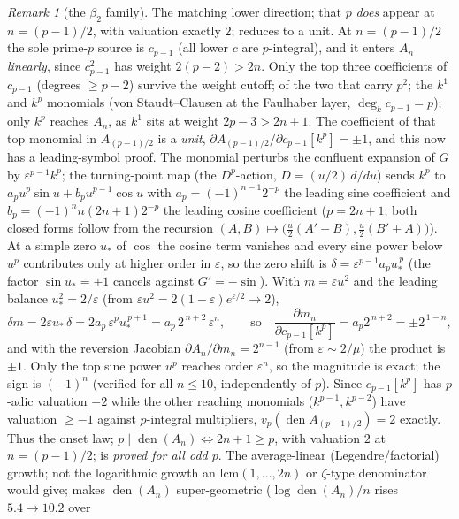 \documentclass[11pt]{article}
\theoremstyle{plain}
\theoremstyle{definition}
\theoremstyle{remark}
\newtheorem{remark}[theorem]{Remark}
\begin{document}
\begin{remark}[the $\beta_2$ family]
The matching lower direction; that $p$ \emph{does} appear at $n=(p-1)/2$, with valuation
exactly $2$; reduces to a unit. At $n=(p-1)/2$ the sole prime-$p$ source is $c_{p-1}$ (all lower
$c$ are $p$-integral), and it enters $A_n$ \emph{linearly}, since $c_{p-1}^2$ has weight
$2(p-2)>2n$. Only the top three coefficients of $c_{p-1}$ (degrees $\ge p-2$) survive the weight
cutoff; of the two that carry $p^2$; the $k^1$ and $k^p$ monomials (von Staudt--Clausen at the
Faulhaber layer, $\deg_kc_{p-1}=p$); only $k^p$ reaches $A_n$, as $k^1$ sits at weight
$2p-3>2n+1$. The coefficient of that top monomial in $A_{(p-1)/2}$ is a \emph{unit},
$\partial A_{(p-1)/2}/\partial c_{p-1}[k^p]=\pm1$, and this now has a leading-symbol proof. The
monomial perturbs the confluent expansion of $G$ by $\varepsilon^{p-1}k^p$; the turning-point map
(the $D^p$-action, $D=(u/2)\,d/du$) sends $k^p$ to $a_pu^p\sin u+b_pu^{p-1}\cos u$ with
$a_p=(-1)^{n-1}2^{-p}$ the leading sine coefficient and $b_p=(-1)^nn(2n+1)2^{-p}$ the leading cosine
coefficient ($p=2n+1$; both closed forms follow from the recursion
$(A,B)\mapsto\bigl(\tfrac u2(A'-B),\tfrac u2(B'+A)\bigr)$). At a simple zero $u_*$ of $\cos$ the
cosine term vanishes and every sine power below $u^p$ contributes only at higher order in
$\varepsilon$, so the zero shift is $\delta=\varepsilon^{p-1}a_pu_*^{\,p}$ (the factor
$\sin u_*=\pm1$ cancels against $G'=-\sin$). With $m=\varepsilon u^2$ and the leading balance
$u_*^2=2/\varepsilon$ (from $\varepsilon u^2=2(1-\varepsilon)e^{\varepsilon/2}\to2$),
\[
   \delta m=2\varepsilon u_*\,\delta=2a_p\,\varepsilon^{p}u_*^{\,p+1}
   =a_p\,2^{\,n+2}\,\varepsilon^{n},\qquad\text{so}\quad
   \frac{\partial m_n}{\partial c_{p-1}[k^p]}=a_p2^{\,n+2}=\pm2^{\,1-n},
\]
and with the reversion Jacobian $\partial A_n/\partial m_n=2^{n-1}$ (from $\varepsilon\sim2/\mu$)
the product is $\pm1$. Only the top sine power $u^p$ reaches order $\varepsilon^n$, so the magnitude
is exact; the sign is $(-1)^n$ (verified for all $n\le10$, independently of $p$). Since
$c_{p-1}[k^p]$ has $p$-adic valuation $-2$ while the other reaching monomials ($k^{p-1},k^{p-2}$)
have valuation $\ge-1$ against $p$-integral multipliers, $v_p(\operatorname{den}A_{(p-1)/2})=2$
exactly. Thus the onset law; $p\mid\operatorname{den}(A_n)\iff 2n+1\ge p$, with valuation $2$ at
$n=(p-1)/2$; is \emph{proved for all odd $p$}. The average-linear
(Legendre/factorial) growth; not the logarithmic growth an $\mathrm{lcm}(1,\dots,2n)$ or
$\zeta$-type denominator would give; makes
$\operatorname{den}(A_n)$ super-geometric ($\log\operatorname{den}(A_n)/n$ rises $5.4\to10.2$ over

\end{remark}
\end{document}
